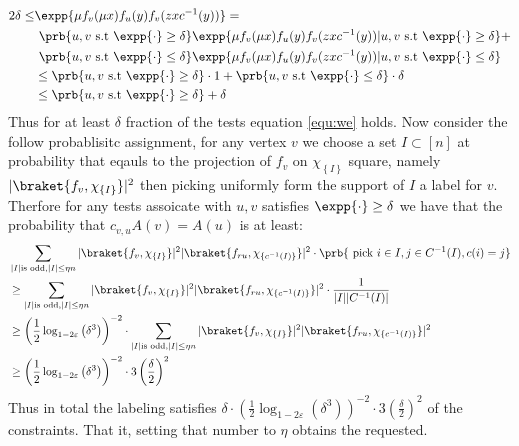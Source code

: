 \documentclass{article}
\newcommand{\Chi}[1]{\chi_{ \left\{ #1  \right\} } }
\begin{document}
  \begin{equation*}
    \begin{split}
      2\delta \le  &  \expp{\mu f_{v}(\mu x )f_{u}(y)f_{v}(zx c^{-1}(y))} = \\ 
    & \  \prb{ u,v \text{ s.t } \expp{ \cdot } \ge \delta }  \expp{\mu f_{v}(\mu x )f_{u}(y)f_{v}(zx c^{-1}(y)) | u,v \text{ s.t } \expp{ \cdot  } \ge \delta  } +\\ 
  & \  \prb{ u,v \text{ s.t } \expp{\cdot }\le \delta } \expp{\mu f_{v}(\mu x )f_{u}(y)f_{v}(zx c^{-1}(y)) | u,v \text{ s.t } \expp{\cdot } \le \delta } \\
& \le \prb{ u,v \text{ s.t } \expp{ \cdot } \ge \delta} \cdot 1 + \prb{ u,v \text{ s.t } \expp{\cdot } \le \delta}  \cdot \delta \\ 
            & \le \prb{ u,v \text{ s.t } \expp{\cdot }\ge \delta}  + \delta 
    \end{split}
  \end{equation*}
  Thus for at least $\delta$ fraction of the tests equation \ref{equ:we} holds. Now consider the follow probablisitc assignment, for any vertex $v$ we choose a set $I \subset [n]$ at probability that eqauls to the projection of $f_{v}$ on $\Chi{I}$ square, namely $|\braket{f_{v},\Chi{I} }|^{2}$ then picking uniformly form the support of $I$ a label for $v$. Therfore for any tests assoicate with $u,v$ satisfies $\expp{\cdot} \ge \delta$ we have that the probability that $c_{v,u}A(v)=A(u)$ is at least:     
  \begin{equation*}
    \begin{split}
      & \sum_{|I| \text{is odd} , |I| \le \eta n  }{|\braket{f_{v},\Chi{I} }|^{2}|\braket{f_{ru},\Chi{c^{-1}(I)} }|^{2}  \cdot \prb{\text{ pick } i \in I, j\in C^{-1}(I) , c(i)=j }  } \\ 
      & \ge \sum_{|I| \text{is odd} , |I| \le \eta n  }{|\braket{f_{v},\Chi{I} }|^{2}|\braket{f_{ru},\Chi{c^{-1}(I)} }|^{2} \cdot \frac{1}{|I||C^{-1}(I)|}} \\ 
      & \ge \left(\frac{1}{2} \log_{1-2\varepsilon}\left( \delta^{3} \right)\right)^{-2}\cdot \sum_{|I| \text{is odd} , |I| \le \eta n  }{|\braket{f_{v},\Chi{I} }|^{2}|\braket{f_{ru},\Chi{c^{-1}(I)} }|^{2}} \\
      & \ge \left(\frac{1}{2} \log_{1-2\varepsilon}\left( \delta^{3} \right)\right)^{-2}\cdot 3\left( \frac{\delta}{2} \right)^{2} 
    \end{split}
  \end{equation*}
  Thus in total the labeling satisfies $\delta \cdot \left(\frac{1}{2} \log_{1-2\varepsilon}\left( \delta^{3} \right)\right)^{-2}\cdot 3\left( \frac{\delta}{2} \right)^{2} $ of the constraints. That it, setting that number to $\eta$ obtains the requested.   
\end{document}
